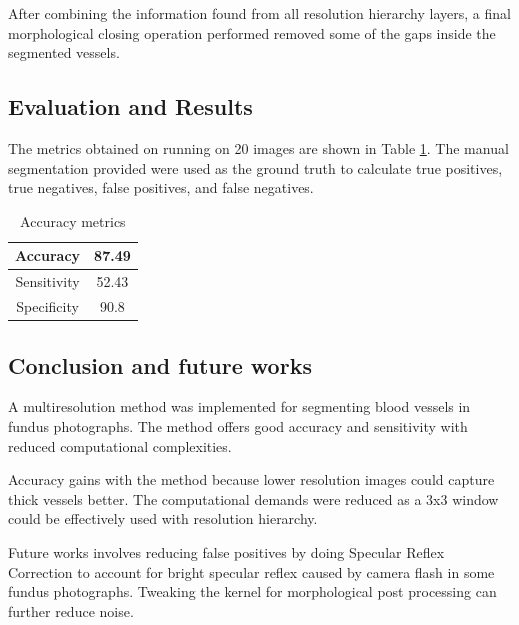 \documentclass[conference]{IEEEtran}
\begin{document}
\par

After combining the information found from all resolution hierarchy layers, a final morphological closing operation performed removed some of the gaps inside the segmented vessels.

\subsection{Evaluation and Results}
\label{ssec:gresults}
\par

The metrics obtained on running on 20 images are shown in Table \ref{table:3}. The manual segmentation provided were used as the ground truth to calculate true positives, true negatives, false positives, and false negatives.

\begin{table}[H]
\centering
 \begin{tabular}{|c| c|} 
 \hline
 Accuracy & 87.49\\ [0.5ex] 
 \hline
 Sensitivity & 52.43 \\ 
 \hline
 Specificity & 90.8\\
 \hline
\end{tabular}
\vspace*{0.25cm}
\caption{Accuracy metrics}
\label{table:3}
\end{table}

\subsection{Conclusion and future works}
\par

A multiresolution method was implemented for segmenting blood vessels in fundus photographs. The method offers good accuracy and sensitivity with reduced computational complexities.
\par
Accuracy gains with the method because lower resolution images could capture thick vessels better. The computational demands were reduced as a 3x3 window could be effectively used with resolution hierarchy.
\par
Future works involves reducing false positives by doing Specular Reflex Correction to account for bright specular reflex caused by camera flash in some fundus photographs. Tweaking the kernel for morphological post processing can further reduce noise.





\end{document}
